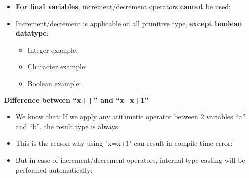 \begin{flushleft}
\begin{itemize}
		\item \textbf{For final variables}, increment/decrement operators \textbf{cannot} be used:
		\bigskip
	
		\item Increment/decrement is applicable on all primitive type, \textbf{except boolean datatype}:
		\begin{itemize}
			\item Integer example:
			\bigskip
			\item Character example:
			\bigskip
			\newpage
			\item Boolean example:
			\bigskip
		
		
		\end{itemize}
		
	\end{itemize}
		
	\textbf{Difference between “x++” and “x=x+1”}
	
	\begin{itemize}
		\item We know that: If we apply any arithmetic operator between 2 variables “a” and “b”, the result type is always:
		\bigskip
		
		\item This is the reason why using "x=x+1" can result in compile-time error:
		\bigskip
	
		\item But in case of increment/decrement operators, internal type casting will be performed automatically:
		\bigskip
		
	\end{itemize}
	
	
		
\end{flushleft}
\newpage